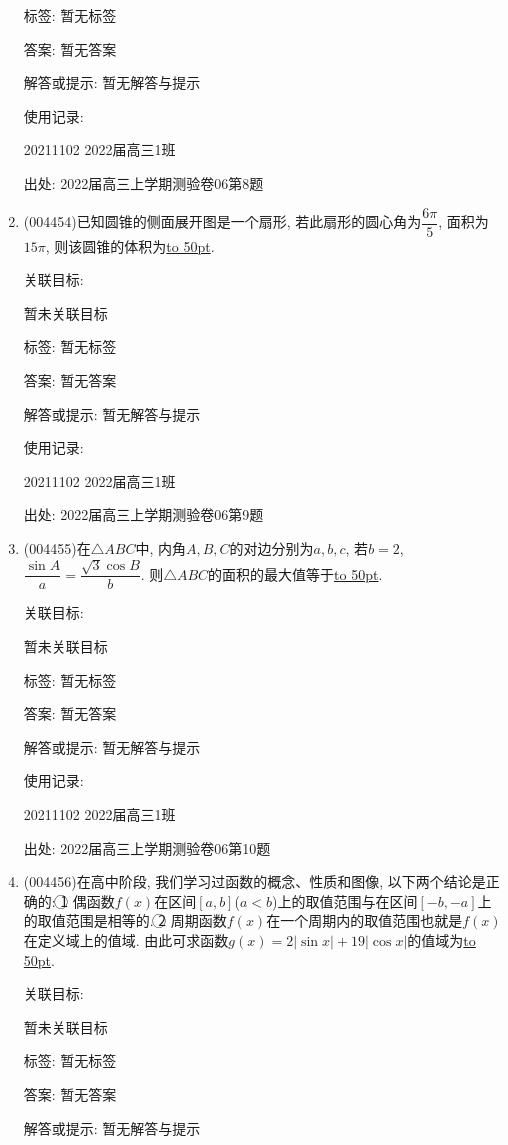 \documentclass[10pt,a4paper]{article}
\newcommand{\blank}[1]{\underline{\hbox to #1pt{}}}
\begin{document}
\begin{enumerate}[1.]
标签: 暂无标签

答案: 暂无答案

解答或提示: 暂无解答与提示

使用记录:

20211102	2022届高三1班	


出处: 2022届高三上学期测验卷06第8题
\item { (004454)}已知圆锥的侧面展开图是一个扇形, 若此扇形的圆心角为$\dfrac{6\pi}5$, 面积为$15\pi$, 则该圆锥的体积为\blank{50}.


关联目标:

暂未关联目标



标签: 暂无标签

答案: 暂无答案

解答或提示: 暂无解答与提示

使用记录:

20211102	2022届高三1班	


出处: 2022届高三上学期测验卷06第9题
\item { (004455)}在$\triangle ABC$中, 内角$A,B,C$的对边分别为$a,b,c$, 若$b=2$, $\dfrac{\sin A}{a}=\dfrac{\sqrt{3}\cos B}{b}$. 则$\triangle ABC$的面积的最大值等于\blank{50}.


关联目标:

暂未关联目标



标签: 暂无标签

答案: 暂无答案

解答或提示: 暂无解答与提示

使用记录:

20211102	2022届高三1班	


出处: 2022届高三上学期测验卷06第10题
\item { (004456)}在高中阶段, 我们学习过函数的概念、性质和图像, 以下两个结论是正确的: \textcircled{1} 偶函数$f(x)$在区间$[a,b]$($a<b$)上的取值范围与在区间$[-b,-a]$上的取值范围是相等的. \textcircled{2} 周期函数$f(x)$在一个周期内的取值范围也就是$f(x)$在定义域上的值域. 由此可求函数$g(x)=2|\sin x|+19|\cos x|$的值域为\blank{50}.


关联目标:

暂未关联目标



标签: 暂无标签

答案: 暂无答案

解答或提示: 暂无解答与提示


\end{enumerate}
\end{document}
